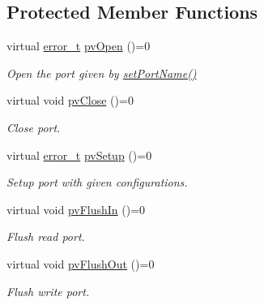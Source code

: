 \subsection*{Protected Member Functions}
\begin{DoxyCompactItemize}
\item 
virtual \hyperlink{classmdt_abstract_port_ad4121bb930c95887e77f8bafa065a85e}{error\_\-t} \hyperlink{classmdt_abstract_port_ac1440ea9759cbbee9efc5ea22afcdb0a}{pvOpen} ()=0
\begin{DoxyCompactList}\small\item\em Open the port given by \hyperlink{classmdt_abstract_port_a0ca143d32fc677bac7c1cf0e04144932}{setPortName()} \end{DoxyCompactList}\item 
virtual void \hyperlink{classmdt_abstract_port_add29e91ccc4be62ab5c0dcb2a68ae8f0}{pvClose} ()=0
\begin{DoxyCompactList}\small\item\em Close port. \end{DoxyCompactList}\item 
virtual \hyperlink{classmdt_abstract_port_ad4121bb930c95887e77f8bafa065a85e}{error\_\-t} \hyperlink{classmdt_abstract_port_a880e5ae1699af102f9a80501bb6a0021}{pvSetup} ()=0
\begin{DoxyCompactList}\small\item\em Setup port with given configurations. \end{DoxyCompactList}\item 
virtual void \hyperlink{classmdt_abstract_port_a1fe88e9d56c0881b9566664b094b0958}{pvFlushIn} ()=0
\begin{DoxyCompactList}\small\item\em Flush read port. \end{DoxyCompactList}\item 
virtual void \hyperlink{classmdt_abstract_port_a1667fa938d3a7578b73f54c32015c369}{pvFlushOut} ()=0
\begin{DoxyCompactList}\small\item\em Flush write port. \end{DoxyCompactList}\end{DoxyCompactItemize}
